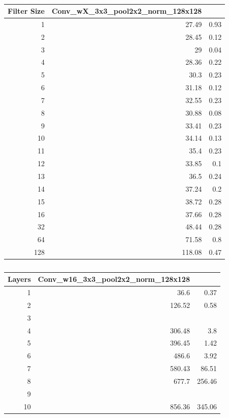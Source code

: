 \documentclass{article}
\begin{document}
\begin{table}[htbp]
	\caption{}
	\begin{tabular}{|r|r|r|}
		\hline
		\multicolumn{1}{|l|}{Filter Size} & \multicolumn{1}{l|}{Conv\_wX\_3x3\_pool2x2\_norm\_128x128} & \multicolumn{1}{l|}{} \\ \hline
		1 & 27.49 & 0.93 \\ \hline
		2 & 28.45 & 0.12 \\ \hline
		3 & 29 & 0.04 \\ \hline
		4 & 28.36 & 0.22 \\ \hline
		5 & 30.3 & 0.23 \\ \hline
		6 & 31.18 & 0.12 \\ \hline
		7 & 32.55 & 0.23 \\ \hline
		8 & 30.88 & 0.08 \\ \hline
		9 & 33.41 & 0.23 \\ \hline
		10 & 34.14 & 0.13 \\ \hline
		11 & 35.4 & 0.23 \\ \hline
		12 & 33.85 & 0.1 \\ \hline
		13 & 36.5 & 0.24 \\ \hline
		14 & 37.24 & 0.2 \\ \hline
		15 & 38.72 & 0.28 \\ \hline
		16 & 37.66 & 0.28 \\ \hline
		32 & 48.44 & 0.28 \\ \hline
		64 & 71.58 & 0.8 \\ \hline
		128 & 118.08 & 0.47 \\ \hline
	\end{tabular}
	\label{}
\end{table}

\begin{table}[htbp]
	\caption{}
	\begin{tabular}{|r|r|r|}
		\hline
		\multicolumn{1}{|l|}{Layers} & \multicolumn{1}{l|}{Conv\_w16\_3x3\_pool2x2\_norm\_128x128} & \multicolumn{1}{l|}{} \\ \hline
		1 & 36.6 & 0.37 \\ \hline
		2 & 126.52 & 0.58 \\ \hline
		3 & \multicolumn{1}{l|}{} & \multicolumn{1}{l|}{} \\ \hline
		4 & 306.48 & 3.8 \\ \hline
		5 & 396.45 & 1.42 \\ \hline
		6 & 486.6 & 3.92 \\ \hline
		7 & 580.43 & 86.51 \\ \hline
		8 & 677.7 & 256.46 \\ \hline
		9 & \multicolumn{1}{l|}{} & \multicolumn{1}{l|}{} \\ \hline
		10 & 856.36 & 345.06 \\ \hline
	\end{tabular}
	\label{}
\end{table}






\end{document}
